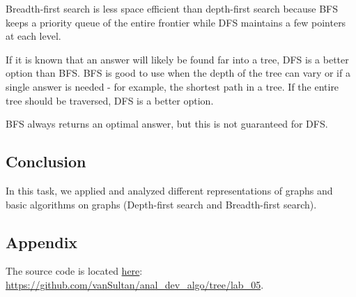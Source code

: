 Breadth-first search is less space efficient than depth-first search because BFS keeps a priority queue of the entire frontier while DFS maintains a few pointers at each level.

If it is known that an answer will likely be found far into a tree, DFS is a better option than BFS. BFS is good to use when the depth of the tree can vary or if a single answer is needed - for example, the shortest path in a tree.
If the entire tree should be traversed, DFS is a better option.

BFS always returns an optimal answer, but this is not guaranteed for DFS\@.

\subsection{Conclusion}\label{subsec:conclusion}

In this task, we applied and analyzed different representations of graphs and basic algorithms on graphs (Depth-first search and Breadth-first search).

\subsection{Appendix}\label{subsec:appendix}

The source code is located \href{https://github.com/vanSultan/anal_dev_algo/tree/lab_05}{here}: \url{https://github.com/vanSultan/anal_dev_algo/tree/lab_05}.
